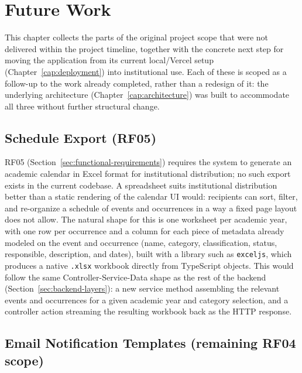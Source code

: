 %
%
\chapter{Future Work} \label{cap:future-work}

This chapter collects the parts of the original project scope that were not delivered within the project timeline, together with the concrete next step for moving the application from its current local/Vercel setup (Chapter~\ref{cap:deployment}) into institutional use. Each of these is scoped as a follow-up to the work already completed, rather than a redesign of it: the underlying architecture (Chapter~\ref{cap:architecture}) was built to accommodate all three without further structural change.

\section{Schedule Export (RF05)} \label{sec:future-export}

RF05 (Section~\ref{sec:functional-requirements}) requires the system to generate an academic calendar in Excel format for institutional distribution; no such export exists in the current codebase. A spreadsheet suits institutional distribution better than a static rendering of the calendar UI would: recipients can sort, filter, and re-organize a schedule of events and occurrences in a way a fixed page layout does not allow. The natural shape for this is one worksheet per academic year, with one row per occurrence and a column for each piece of metadata already modeled on the event and occurrence (name, category, classification, status, responsible, description, and dates), built with a library such as \texttt{exceljs}, which produces a native \texttt{.xlsx} workbook directly from TypeScript objects. This would follow the same Controller-Service-Data shape as the rest of the backend (Section~\ref{sec:backend-layers}): a new service method assembling the relevant events and occurrences for a given academic year and category selection, and a controller action streaming the resulting workbook back as the HTTP response.

\section{Email Notification Templates (remaining RF04 scope)} \label{sec:future-notification-templates}

